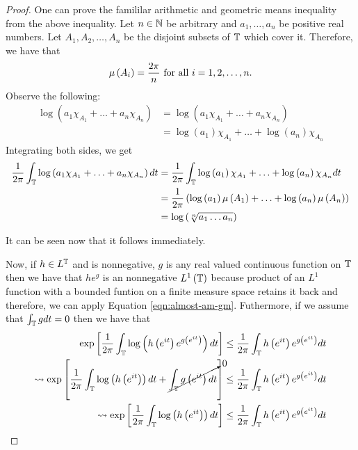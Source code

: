 \begin{proof}
    One can prove the famililar arithmetic and geometric means inequality from the above inequality. Let $n\in \mathbb N$ be arbitrary and $a_{1}, \ldots, a_{n}$ be positive real numbers. Let $A_{1}, A_{2}, \ldots , A_{n}$ be the disjoint subsets of $\mathbb T$ which cover it. Therefore, we have that
    \begin{align*}
	\mu \left( A_{i} \right) = \frac{2\pi}{n} \text{ for all } i=1,2,\ldots,n\text.
    \end{align*}
    Observe the following:
    \begin{align*}
	\log\left( a_{1} \chi_{A_{1}} + \ldots + a_{n} \chi_{A_{n}} \right) &= \log \left( a_{1} \chi_{A_{1}} + \ldots + a_{n} \chi_{A_{n}} \right) \\
	&= \log \left( a_{1} \right) \chi_{A_{1}} + \ldots + \log \left( a_{n} \right) \chi_{A_{n}}
    \end{align*}
    Integrating both sides, we get
    \begin{align*}
	\frac{1}{2\pi} \int_{\mathbb T} \log\left( a_{1} \chi_{A_{1}} + \ldots + a_{n} \chi_{A_{n}} \right) dt &= \frac{1}{2\pi} \int_{\mathbb T}  \log \left( a_{1} \right) \chi_{A_{1}} + \ldots + \log \left( a_{n} \right) \chi_{A_{n}} dt \\
	&= \frac{1}{2\pi} \left( \log \left( a_{1} \right) \mu \left( A_{1} \right) + \ldots +  \log \left( a_{n} \right) \mu \left( A_{n} \right) \right) \\
	&=  \log \left( \sqrt[n]{a_{1}\ldots a_{n}} \right)
    \end{align*}
     
    It can be seen now that it follows immediately.


    Now, if $h\in L^{\mathbb T}$ and is nonnegative, $g$ is any real valued continuous function on $\mathbb T$ then we have that $he^{g}$ is an nonnegative $L^{1} \left( \mathbb T \right)$ because product of an $L^{1}$ function with a bounded funtion on a finite measure space retains it back and therefore, we can apply Equation \ref{eqn:almost-am-gm}. Futhermore, if we assume that $\int_{\mathbb T} g dt =0 $ then we have that 
    \begin{align*}
	\exp\left[ \frac{1}{2\pi} \int_{\mathbb T} \log \left( h\left( e^{it} \right) e^{g\left( e^{it} \right)}\right) dt \right] \le \frac{1}{2\pi} \int_{\mathbb T} h\left( e^{it} \right) e^{g\left( e^{it} \right)} dt \\
	\leadsto \exp\left[ \frac{1}{2\pi} \int_{\mathbb T} \log \left( h\left( e^{it} \right) \right) dt + \cancelto{0}{\int_{\mathbb T} g\left( e^{it} \right) dt} \right] \le \frac{1}{2\pi} \int_{\mathbb T} h\left( e^{it} \right) e^{g\left( e^{it} \right)} dt \\
\leadsto \exp\left[ \frac{1}{2\pi} \int_{\mathbb T} \log \left( h\left( e^{it} \right) \right) dt  \right] \le \frac{1}{2\pi} \int_{\mathbb T} h\left( e^{it} \right) e^{g\left( e^{it} \right)} dt \\
    \end{align*}


\end{proof}
